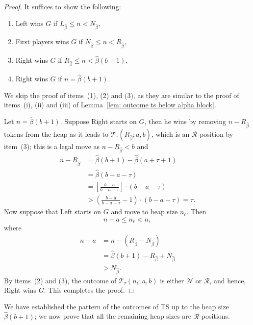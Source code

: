 \documentclass[oneside,reqno]{amsart}
\newcommand{\ts}{\mathcal{T}}
\newcommand{\rp}{\mathscr{R}}
\newcommand{\np}{\mathscr{N}}
\newcommand{\hbeta}{\widehat\beta}
\begin{document}
\begin{proof}
    It suffices to show the following:
    \begin{enumerate}
        \item Left wins $G$ if $L_{\hbeta}\le n<N_{\hbeta}$,
        \item First players wins $G$ if $N_{\hbeta}\le n<R_{\hbeta}$,
        \item Right wins $G$ if $R_{\hbeta}\le n< {\hbeta}(b+1)$,
        \item Right wins $G$ if $n={\hbeta}(b+1)$.
    \end{enumerate}
    We skip the proof of items~(1), (2) and (3), as they are similar to the proof of items~(i), (ii) and (iii) of Lemma~\ref{lem: outcome ts below alpha block}.  

    Let $n=\hbeta(b+1)$.  Suppose Right starts on $G$, then he wins by removing $n-R_{\hbeta}$ tokens from the heap as it leads to $\ts_\tau(R_{\hbeta};a,b)$, which is an $\rp$-position by item~(3); this is a legal move as $n-R_{\hbeta}<b$ and
\begin{align}
    n-R_{\hbeta}&={\hbeta}(b+1)-{\hbeta}(a+\tau+1)\nonumber\\
    &={\hbeta}(b-a-\tau)\nonumber\\
    &=\left\lfloor\frac{b-a}{b-a-\tau}\right\rfloor \cdot (b-a-\tau)\nonumber\\
    &>\left(\frac{b-a}{b-a-\tau}-1\right) \cdot (b-a-\tau) =\tau.\label{eq:2}
\end{align}
Now suppose that Left starts on $G$ and move to heap size $n_\ell$. Then $$n-a\le n_\ell<n,$$
where \begin{align*}n-a  &=  n-(R_{\hbeta}-N_{\hbeta}) \\
&={\hbeta}(b+1)-R_{\hbeta} +N_{\hbeta} \\
&> N_{\hbeta}.\end{align*} By items~(2) and (3), the outcome of $\ts_\tau(n_\ell;a,b)$ is either $\np$ or $\rp$, and hence, Right wins $G$.  This completes the proof.
\end{proof}

We have established the pattern of the outcomes of {\sc TS} up to the heap size $\hbeta(b+1)$; we now prove that all the remaining heap sizes are $\rp$-positions.
\end{document}
